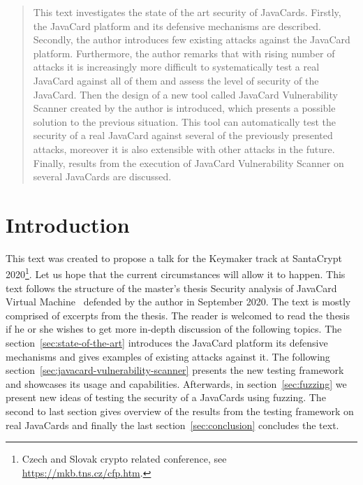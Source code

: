 \documentclass{../llncs/llncs}
\begin{document}
\maketitle

\begin{abstract}
This text investigates the state of the art security of JavaCards. Firstly, the JavaCard platform and its defensive mechanisms are described. Secondly, the author introduces few existing attacks against the JavaCard platform. Furthermore, the author remarks that with rising number of attacks it is increasingly more difficult to systematically test a real JavaCard against all of them and assess the level of security of the JavaCard. Then the design of a new tool called JavaCard Vulnerability Scanner created by the author is introduced, which presents a possible solution to the previous situation. This tool can automatically test the security of a real JavaCard against several of the previously presented attacks, moreover it is also extensible with other attacks in the future. Finally, results from the execution of JavaCard Vulnerability Scanner on several JavaCards are discussed.
\end{abstract}


\section{Introduction}

This text was created to propose a talk for the Keymaker track at SantaCrypt 2020\footnote{Czech and Slovak crypto related conference, see \url{https://mkb.tns.cz/cfp.htm}.}. Let us hope that the current circumstances will allow it to happen. This text follows the structure of the master's thesis Security analysis of JavaCard Virtual Machine~\cite{Kvapil2020thesis} defended by the author in September 2020. The text is mostly comprised of excerpts from the thesis. The reader is welcomed to read the thesis if he or she wishes to get more in-depth discussion of the following topics.
The section~\ref{sec:state-of-the-art} introduces the JavaCard platform its defensive mechanisms and gives examples of existing attacks against it. The following section~\ref{sec:javacard-vulnerability-scanner} presents the new testing framework \projectname and showcases its usage and capabilities. Afterwards, in section~\ref{sec:fuzzing} we present new ideas of testing the security of a JavaCards using fuzzing. The second to last section gives overview of the results from the testing framework on real JavaCards and finally the last section~\ref{sec:conclusion} concludes the text.
\end{document}
